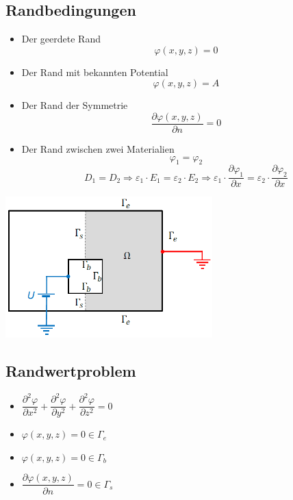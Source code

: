 \subsection{Randbedingungen}
\begin{minipage}{8cm}
	\begin{itemize}
		\item Der geerdete Rand \[\varphi(x,y,z) = 0\]
		\item Der Rand mit bekannten Potential \[ \varphi(x,y,z) = A \]
		\item Der Rand der Symmetrie \[ \dfrac{\partial\varphi(x,y,z)}{\partial n} = 0\]
		\item Der Rand zwischen zwei Materialien \[\varphi_{1}=\varphi_{2}\]
		\[ D_1 = D_2 \Rightarrow \varepsilon_1 \cdot E_{1}=\varepsilon_2 \cdot E_{2} \Rightarrow \varepsilon_1\cdot\dfrac{\partial\varphi_1}{\partial x} = \varepsilon_2\cdot\dfrac{\partial\varphi_2}{\partial x}\]
	\end{itemize}
\end{minipage}
\begin{minipage}{8cm}
	\includegraphics[width=8cm]{images/randbedinung_ES.png}
\end{minipage}
\subsection{Randwertproblem}
\begin{multicols}{2}
\begin{itemize}
	\item $\dfrac{\partial^2\varphi}{\partial x^2} +  \dfrac{\partial^2\varphi}{\partial y^2} + \dfrac{\partial^2\varphi}{\partial z^2}=0 $
	\item $\varphi(x,y,z)=0 \in \Gamma_e$
	\item $\varphi(x,y,z)=0 \in \Gamma_b$
	\item $ \dfrac{\partial\varphi(x,y,z)}{\partial n} = 0 \in \Gamma_s$
\end{itemize}
\end{multicols}
